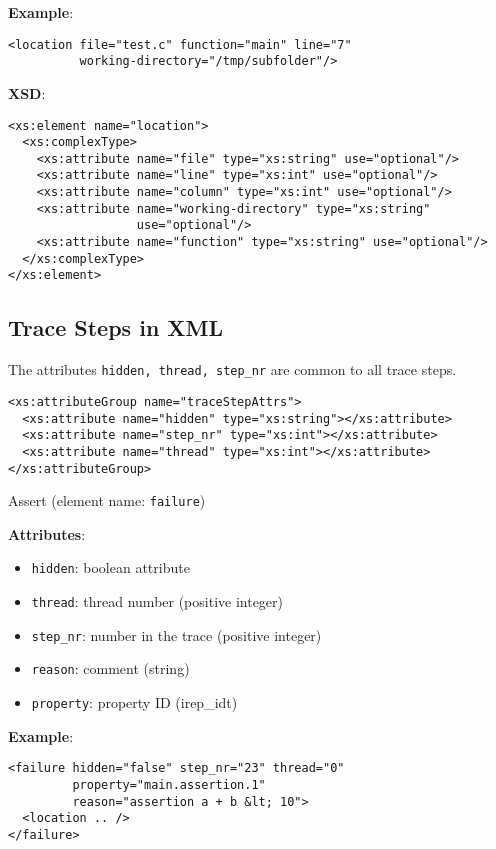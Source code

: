 \documentclass[12pt]{article}
\begin{document}
\noindent\textbf{Example}:
\begin{verbatim}
<location file="test.c" function="main" line="7"
          working-directory="/tmp/subfolder"/>
\end{verbatim}

\noindent\textbf{XSD}:
\begin{verbatim}
<xs:element name="location">
  <xs:complexType>
    <xs:attribute name="file" type="xs:string" use="optional"/>
    <xs:attribute name="line" type="xs:int" use="optional"/>
    <xs:attribute name="column" type="xs:int" use="optional"/>
    <xs:attribute name="working-directory" type="xs:string"
                  use="optional"/>
    <xs:attribute name="function" type="xs:string" use="optional"/>
  </xs:complexType>
</xs:element>
\end{verbatim}

\subsection{Trace Steps in XML}

\noindent The attributes \texttt{hidden, thread, step\_nr} are common to all trace steps.

\begin{verbatim}
<xs:attributeGroup name="traceStepAttrs">
  <xs:attribute name="hidden" type="xs:string"></xs:attribute>
  <xs:attribute name="step_nr" type="xs:int"></xs:attribute>
  <xs:attribute name="thread" type="xs:int"></xs:attribute>
</xs:attributeGroup>
\end{verbatim}

\begin{center}
{\Large Assert} (element name: \texttt{failure})
\end{center}

\noindent\textbf{Attributes}:
\begin{itemize}
\item \texttt{hidden}: boolean attribute
\item \texttt{thread}: thread number (positive integer)
\item \texttt{step\_nr}: number in the trace (positive integer)
\item \texttt{reason}: comment (string)
\item \texttt{property}: property ID (irep\_idt)
\end{itemize}

\noindent\textbf{Example}:
\begin{verbatim}
<failure hidden="false" step_nr="23" thread="0"
         property="main.assertion.1"
         reason="assertion a + b &lt; 10">
  <location .. />
</failure>
\end{verbatim}
\end{document}
